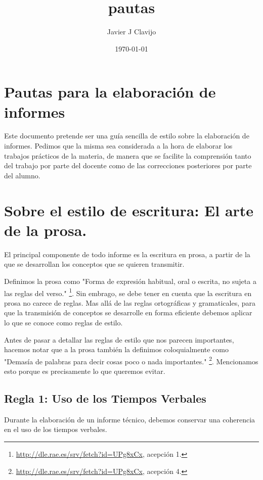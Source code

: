 \documentclass[11pt]{article}
\author{Javier J Clavijo}
\date{\today}
\title{pautas}
\begin{document}
\maketitle
\tableofcontents

\section{Pautas para la elaboración de informes}
\label{sec-1}

Este documento pretende ser una guía sencilla de estilo sobre la elaboración de 
informes. Pedimos que la misma sea considerada a la hora de elaborar los 
trabajos prácticos de la materia, de manera que se facilite la comprensión tanto
del trabajo por parte del docente como de las correcciones posteriores por parte
del alumno.

\section{Sobre el estilo de escritura: El arte de la prosa.}
\label{sec-2}

El principal componente de todo informe es la escritura en prosa, a partir de
la que se desarrollan los conceptos que se quieren transmitir.

Definimos la prosa como "Forma de expresión habitual, oral o escrita, 
no sujeta a las reglas del verso." \footnote{\url{http://dle.rae.es/srv/fetch?id=UPg8xCx}, acepción 1.}. Sin embrago, se debe tener en cuenta que
la escritura en prosa no carece de reglas. Mas allá de las reglas ortográficas y
gramaticales, para que la transmisión de conceptos se desarrolle en forma eficiente
debemos aplicar lo que se conoce como reglas de estilo.

Antes de pasar a detallar las reglas de estilo que nos parecen importantes, hacemos 
notar que a la prosa también la definimos coloquialmente como "Demasía de palabras para 
decir cosas poco o nada importantes." \footnote{\url{http://dle.rae.es/srv/fetch?id=UPg8xCx}, acepción 4.}. Mencionamos esto porque es precisamente
lo que queremos evitar.

\subsection{Regla 1: Uso de los Tiempos Verbales}
\label{sec-2-1}

Durante la elaboración de un informe técnico, debemos conservar una coherencia en el
uso de los tiempos verbales. 
\end{document}
